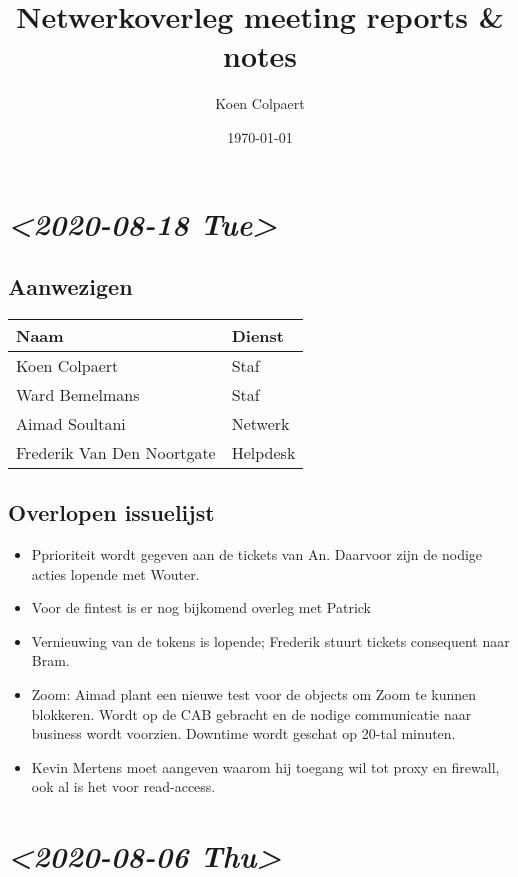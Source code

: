 \documentclass[11pt]{article}
\author{Koen Colpaert}
\date{\today}
\title{Netwerkoverleg meeting reports \& notes}
\begin{document}
\maketitle

\section{\textit{<2020-08-18 Tue>}}
\label{sec:org8e236e9}
\subsection{Aanwezigen}
\label{sec:orge816151}
\begin{center}
\begin{tabular}{ll}
Naam & Dienst\\
\hline
Koen Colpaert & Staf\\
Ward Bemelmans & Staf\\
Aimad Soultani & Netwerk\\
Frederik Van Den Noortgate & Helpdesk\\
\end{tabular}
\end{center}

\subsection{Overlopen issuelijst}
\label{sec:org0f7481a}
\begin{itemize}
\item Pprioriteit wordt gegeven aan de tickets van An. Daarvoor zijn de nodige acties lopende met Wouter.
\item Voor de fintest is er nog bijkomend overleg met Patrick
\item Vernieuwing van de tokens is lopende; Frederik stuurt tickets consequent naar Bram.
\item Zoom: Aimad plant een nieuwe test voor de objects om Zoom te kunnen blokkeren. Wordt op de CAB gebracht en de nodige communicatie naar business wordt voorzien. Downtime wordt geschat op 20-tal minuten.
\item Kevin Mertens moet aangeven waarom hij toegang wil tot proxy en firewall, ook al is het voor read-access.
\end{itemize}


\section{\textit{<2020-08-06 Thu>}}
\label{sec:org1229ec7}
\end{document}
